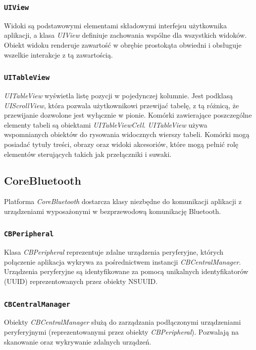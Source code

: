  \subsubsection{\lstinline$UIView$}
Widoki są podstawowymi elementami składowymi interfejsu użytkownika aplikacji, a klasa \textit{UIView} definiuje zachowania wspólne dla wszystkich widoków. Obiekt widoku renderuje zawartość w obrębie prostokąta obwiedni i obsługuje wszelkie interakcje z tą zawartością. 

 \subsubsection{\lstinline$UITableView$}
\textit{UITableView} wyświetla listę pozycji w pojedynczej kolumnie. Jest podklasą \textit{UIScrollView}, która pozwala użytkownikowi przewijać tabelę, z tą różnicą, że przewijanie dozwolone jest wyłącznie w pionie. Komórki zawierające poszczególne elementy tabeli są obiektami \textit{UITableViewCell}. \textit{UITableView} używa wspomnianych obiektów do rysowania widocznych wierszy tabeli. Komórki mogą posiadać tytuły treści, obrazy oraz widoki akcesoriów, które mogą pełnić rolę elementów sterujących takich jak przełączniki i suwaki. 

\subsection{CoreBluetooth}
Platforma \textit{CoreBluetooth} dostarcza klasy niezbędne do komunikacji aplikacji z urządzeniami wyposażonymi w bezprzewodową komunikację Bluetooth.

 \subsubsection{\lstinline$CBPeripheral$}
Klasa \textit{CBPeripheral} reprezentuje zdalne urządzenia peryferyjne, których połączenie  aplikacja wykrywa za pośrednictwem instancji \textit{CBCentralManager}. Urządzenia peryferyjne są identyfikowane za pomocą unikalnych identyfikatorów (UUID) reprezentowanych przez obiekty NSUUID. 

 \subsubsection{\lstinline$CBCentralManager$}
Obiekty \textit{CBCentralManager} służą do zarządzania podłączonymi urządzeniami peryferyjnymi (reprezentowanymi przez obiekty \textit{CBPeripheral}). Pozwalają na skanowanie oraz wykrywanie zdalnych urządzeń.

